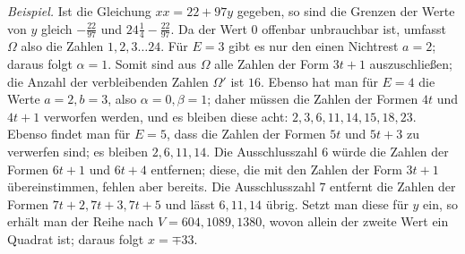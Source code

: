 \textit{Beispiel.} Ist die Gleichung \(xx=22+97y\) gegeben, so sind die Grenzen der Werte von \(y\) gleich \(-\frac{22}{97}\) und \(24\frac14-\frac{22}{97}\). Da der Wert \(0\) offenbar unbrauchbar ist, umfasst \(\Omega\) also die Zahlen \(1,\allowbreak 2,\allowbreak 3\ldots24\). Für \(E=3\) gibt es nur den einen Nichtrest \(a=2\); daraus folgt \(\alpha=1\). Somit sind aus \(\Omega\) alle Zahlen der Form \(3t+1\) auszuschließen; die Anzahl der verbleibenden Zahlen \(\Omega'\) ist \(16\). Ebenso hat man für \(E=4\) die Werte \(a=2,\allowbreak b=3\), also \(\alpha=0,\allowbreak \beta=1\); daher müssen die Zahlen der Formen \(4t\) und \(4t+1\) verworfen werden, und es bleiben diese acht: \(2,\allowbreak 3,\allowbreak 6,\allowbreak 11,\allowbreak 14,\allowbreak 15,\allowbreak 18,\allowbreak 23\). Ebenso findet man für \(E=5\), dass die Zahlen der Formen \(5t\) und \(5t+3\) zu verwerfen sind; es bleiben \(2,\allowbreak 6,\allowbreak 11,\allowbreak 14\). Die Ausschlusszahl \(6\) würde die Zahlen der Formen \(6t+1\) und \(6t+4\) entfernen; diese, die mit den Zahlen der Form \(3t+1\) übereinstimmen, fehlen aber bereits. Die Ausschlusszahl \(7\) entfernt die Zahlen der Formen \(7t+2,\allowbreak 7t+3,\allowbreak 7t+5\) und lässt \(6,\allowbreak 11,\allowbreak 14\) übrig. Setzt man diese für \(y\) ein, so erhält man der Reihe nach \(V=604,\allowbreak 1089,\allowbreak 1380\), wovon allein der zweite Wert ein Quadrat ist; daraus folgt \(x=\mp33\).

